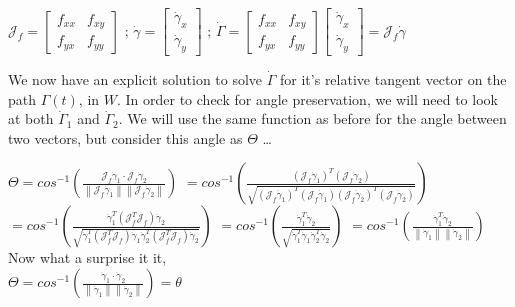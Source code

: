 \documentclass[a4paper,man,natbib]{apa6}
\begin{document}
\begin{center}

      $ \mathcal{J}_f = \begin{bmatrix}
        f_{xx} & f_{xy}\\
        f_{yx} & f_{yy}
        \end{bmatrix} $ ; 
      $ \dot{\gamma} = \begin{bmatrix}
        \dot{\gamma}_x\\
        \dot{\gamma}_y
        \end{bmatrix} $ ;   
      $ \dot{\Gamma} = \begin{bmatrix}
        f_{xx} & f_{xy}\\
        f_{yx} & f_{yy}
        \end{bmatrix}
        \begin{bmatrix}
        \dot{\gamma}_x\\
        \dot{\gamma}_y
        \end{bmatrix} 
        = \mathcal{J}_f\dot{\gamma}$
      
\end{center}

We now have an explicit solution to solve $ \dot{\Gamma} $ for it's relative tangent vector on the path $ \Gamma(t) $, in $ W $.
In order to check for angle preservation, we will need to look at both $ \dot{\Gamma}_1 $ and $ \dot{\Gamma}_2 $.
We will use the same function as before for the angle between two vectors, but consider this angle as $ \Theta $ \dots

\begin{center}

      $ \Theta = cos^{-1}(\frac{\mathcal{J}_f\dot{\gamma}_1 \cdot \mathcal{J}_f\dot{\gamma}_2}{{\left\lVert \mathcal{J}_f\dot{\gamma}_1 \right\rVert \left\lVert \mathcal{J}_f\dot{\gamma}_2  \right\rVert }}) $
      $ = cos^{-1}(\frac{(\mathcal{J}_f\dot{\gamma}_1)^T(\mathcal{J}_f\dot{\gamma}_2)}{\sqrt{{(\mathcal{J}_f\dot{\gamma}_1)^T(\mathcal{J}_f\dot{\gamma}_1)(\mathcal{J}_f\dot{\gamma}_2)^T(\mathcal{J}_f\dot{\gamma}_2)}}})$
      $ = cos^{-1}(\frac{\dot{\gamma}_1^T(\mathcal{J}_f^T\mathcal{J}_f)\dot{\gamma}_2}{\sqrt{\dot{\gamma}_1^T(\mathcal{J}_f^T\mathcal{J}_f)\dot{\gamma}_1\dot{\gamma}_2^T(\mathcal{J}_f^T\mathcal{J}_f)\dot{\gamma}_2}})$
      $ = cos^{-1}(\frac{\dot{\gamma}_1^T\dot{\gamma}_2}{\sqrt{\dot{\gamma}_1^T\dot{\gamma}_1\dot{\gamma}_2^T\dot{\gamma}_2}})$
      $ = cos^{-1}(\frac{\dot{\gamma}_1^T\dot{\gamma}_2}{\left\lVert \dot{\gamma}_1 \right\rVert \left\lVert \dot{\gamma}_2  \right\rVert })$ \\
      Now what a surprise it it, \\
      $ \Theta = cos^{-1}(\frac{\dot{\gamma}_1  \cdot \dot{\gamma}_2 }{\left\lVert \dot{\gamma}_1 \right\rVert \left\lVert \dot{\gamma}_2  \right\rVert }) = \theta $
      
\end{center}
\end{document}
